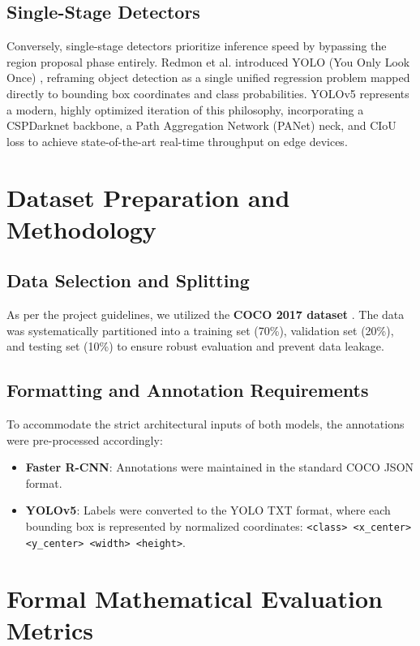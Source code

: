 \documentclass[conference]{IEEEtran}
\begin{document}
\subsection{Single-Stage Detectors}
Conversely, single-stage detectors prioritize inference speed by bypassing the region proposal phase entirely. Redmon et al. introduced YOLO (You Only Look Once) \cite{redmon2016you}, reframing object detection as a single unified regression problem mapped directly to bounding box coordinates and class probabilities. YOLOv5 \cite{yolov5} represents a modern, highly optimized iteration of this philosophy, incorporating a CSPDarknet backbone, a Path Aggregation Network (PANet) neck, and CIoU loss \cite{zheng2020ciou} to achieve state-of-the-art real-time throughput on edge devices.

\section{Dataset Preparation and Methodology}

\subsection{Data Selection and Splitting}
As per the project guidelines, we utilized the \textbf{COCO 2017 dataset} \cite{coco}. The data was systematically partitioned into a training set (70\%), validation set (20\%), and testing set (10\%) to ensure robust evaluation and prevent data leakage.

\subsection{Formatting and Annotation Requirements}
To accommodate the strict architectural inputs of both models, the annotations were pre-processed accordingly:
\begin{itemize}
    \item \textbf{Faster R-CNN}: Annotations were maintained in the standard COCO JSON format.
    \item \textbf{YOLOv5}: Labels were converted to the YOLO TXT format, where each bounding box is represented by normalized coordinates: \texttt{<class> <x\_center> <y\_center> <width> <height>}.
\end{itemize}

\section{Formal Mathematical Evaluation Metrics}
\end{document}
